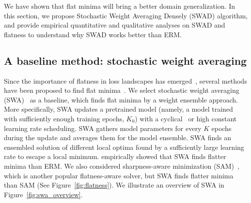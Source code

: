 
We have shown that flat minima will bring a better domain generalization. 
In this section, we 
propose Stochastic Weight Averaging Densely (SWAD) algorithm, and provide empirical quantitative and qualitative analyses on SWAD and flatness to understand why SWAD works better than ERM.

\subsection{A baseline method: stochastic weight averaging}

Since the importance of flatness in loss landscapes has emerged~\cite{keskar2016largebatch,dziugaite2017computing,garipov2018fge,izmailov2018swa,jiang2019fantastic,foret2020sharpness}, several methods have been proposed to find flat minima~\cite{foret2020sharpness,chaudhari2019entropy,izmailov2018swa}. 
We select stochastic weight averaging (SWA)~\cite{izmailov2018swa} as a baseline, which finds flat minima by a weight ensemble approach.
More specifically, SWA updates a pretrained model (namely, a model trained with sufficiently enough training epochs, $K_0$) with a cyclical~\cite{smith2017cyclical} or high constant learning rate scheduling. SWA gathers model parameters for every $K$ epochs during the update and averages them for the model ensemble.
SWA finds an ensembled solution of different local optima found by a sufficiently large learning rate to escape a local minimum. \citet{izmailov2018swa} empirically showed that SWA finds flatter minima than ERM. We also considered sharpness-aware minimization (SAM)~\cite{foret2020sharpness}, which is another popular flatness-aware solver, but SWA finds flatter minima than SAM (See Figure~\ref{fig:flatness}).
We illustrate an overview of SWA in Figure~\ref{fig:swa_overview}.


